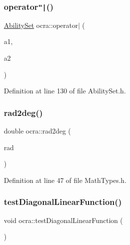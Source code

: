 \hypertarget{namespaceocra_ade6062205230e055930cc06015904895}{}\label{namespaceocra_ade6062205230e055930cc06015904895} 
\subsubsection{\texorpdfstring{operator\texttt{"|}()}{operator|()}}
{\footnotesize\ttfamily \hyperlink{classocra_1_1AbilitySet}{Ability\+Set} ocra\+::operator$\vert$ (\begin{DoxyParamCaption}\item[{const \hyperlink{classocra_1_1AbilitySet}{Ability\+Set}}]{a1,  }\item[{const \hyperlink{classocra_1_1AbilitySet}{Ability\+Set}}]{a2 }\end{DoxyParamCaption})\hspace{0.3cm}{\ttfamily [inline]}}



Definition at line 130 of file Ability\+Set.\+h.

\hypertarget{namespaceocra_a967dc05d7d0b50212fb79c109a16ace3}{}\label{namespaceocra_a967dc05d7d0b50212fb79c109a16ace3} 
\subsubsection{\texorpdfstring{rad2deg()}{rad2deg()}}
{\footnotesize\ttfamily double ocra\+::rad2deg (\begin{DoxyParamCaption}\item[{const double}]{rad }\end{DoxyParamCaption})\hspace{0.3cm}{\ttfamily [inline]}}



Definition at line 47 of file Math\+Types.\+h.

\hypertarget{namespaceocra_aca14a12e382291d2f3a2113ff1348432}{}\label{namespaceocra_aca14a12e382291d2f3a2113ff1348432} 
\subsubsection{\texorpdfstring{test\+Diagonal\+Linear\+Function()}{testDiagonalLinearFunction()}}
{\footnotesize\ttfamily void ocra\+::test\+Diagonal\+Linear\+Function (\begin{DoxyParamCaption}{ }\end{DoxyParamCaption})}



